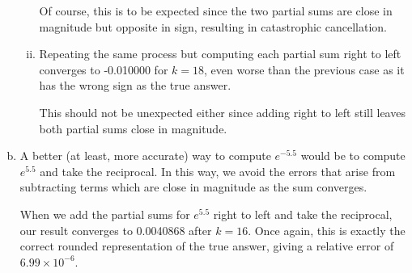 \documentclass[12pt]{article}
\begin{document}
\begin{enumerate}[(a)]
\begin{enumerate}[(i)]
	Of course, this is to be expected since the two partial sums are close in magnitude but opposite in sign, resulting in catastrophic cancellation.

	\item
	Repeating the same process but computing each partial sum right to left converges to -0.010000 for $k = 18$, even worse than the previous case as it has the wrong sign as the true answer. 

	This should not be unexpected either since adding right to left still leaves both partial sums close in magnitude.
	\end{enumerate}

\item
A better (at least, more accurate) way to compute $e^{-5.5}$ would be to compute $e^{5.5}$ and take the reciprocal. In this way, we avoid the errors that arise from subtracting terms which are close in magnitude as the sum converges.

When we add the partial sums for $e^{5.5}$ right to left and take the reciprocal, our result converges to 0.0040868 after $k = 16$. Once again, this is exactly the correct rounded representation of the true answer, giving a relative error of $6.99\times10^{-6}$. 

\end{enumerate}
\end{document}
